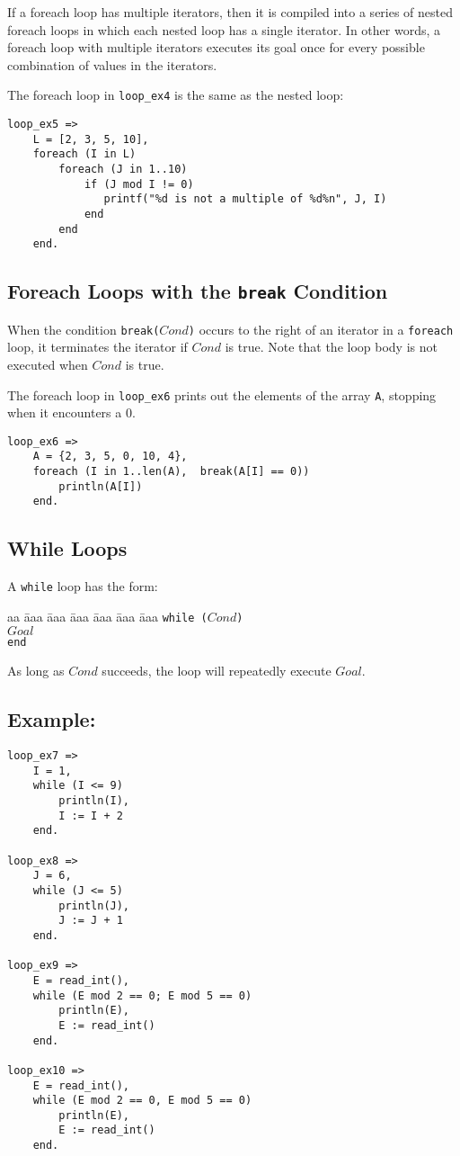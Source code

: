 If a foreach loop has multiple iterators, then it is compiled into a series of nested foreach loops in which each nested loop has a single iterator.  In other words, a foreach loop with multiple iterators executes its goal once for every possible combination of values in the iterators.

The foreach loop in \texttt{loop\_ex4} is the same as the nested loop:
\begin{verbatim}
loop_ex5 =>
    L = [2, 3, 5, 10],
    foreach (I in L)
        foreach (J in 1..10)
            if (J mod I != 0)
               printf("%d is not a multiple of %d%n", J, I)
            end
        end
    end.
\end{verbatim}

\subsection{Foreach Loops with the \texttt{break} Condition}
When the condition \texttt{break($Cond$)} occurs to the right of an iterator in a \texttt{foreach} loop, it terminates the iterator if $Cond$ is true. Note that the loop body is not executed when $Cond$ is true. 

The foreach loop in \texttt{loop\_ex6} prints out the elements of the array \texttt{A}, stopping when it encounters a 0.
\begin{verbatim}
loop_ex6 =>
    A = {2, 3, 5, 0, 10, 4},
    foreach (I in 1..len(A),  break(A[I] == 0))
        println(A[I])
    end.
\end{verbatim}


\subsection{While Loops}
A \texttt{while} loop has the form:
\begin{tabbing}
aa \= aaa \= aaa \= aaa \= aaa \= aaa \= aaa \kill
\> \texttt{while ($Cond$)} \\
\> \> $Goal$  \\
\>  \texttt{end}
\end{tabbing} 
As long as $Cond$ succeeds, the loop will repeatedly execute $Goal$.  
\subsection*{Example:}
\begin{verbatim}
loop_ex7 =>
    I = 1, 
    while (I <= 9)
        println(I),
        I := I + 2
    end.

loop_ex8 =>
    J = 6,
    while (J <= 5)
        println(J),
        J := J + 1
    end.

loop_ex9 =>
    E = read_int(),
    while (E mod 2 == 0; E mod 5 == 0)
        println(E),
        E := read_int()
    end.

loop_ex10 =>
    E = read_int(),
    while (E mod 2 == 0, E mod 5 == 0)
        println(E),
        E := read_int()
    end.
\end{verbatim}

